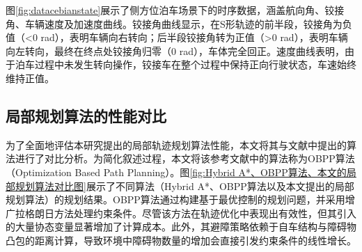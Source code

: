 \documentclass[master,academic]{ysuthesis} %
\begin{document}
		图\ref{fig:datacebianstate}展示了侧方位泊车场景下的时序数据，涵盖航向角、铰接角、车辆速度及加速度曲线。铰接角曲线显示，在S形轨迹的前半段，铰接角为负值（<0 rad），表明车辆向右转向；后半段铰接角转为正值（>0 rad），表明车辆向左转向，最终在终点处铰接角归零（0 rad），车体完全回正。速度曲线表明，由于泊车过程中未发生转向操作，铰接车在整个过程中保持正向行驶状态，车速始终维持正值。

		\subsection{局部规划算法的性能对比}
		为了全面地评估本研究提出的局部轨迹规划算法性能，本文将其与文献\cite{9216948}中提出的算法进行了对比分析。为简化叙述过程，本文将该参考文献中的算法称为OBPP算法（Optimization Based Path Planning）。图\ref{fig:Hybrid A*、OBPP算法、本文的局部规划算法对比图}展示了不同算法（Hybrid A*、OBPP算法以及本文提出的局部规划算法）的规划结果。OBPP算法通过构建基于最优控制的规划问题，并采用增广拉格朗日方法处理约束条件。尽管该方法在轨迹优化中表现出有效性，但其引入的大量协态变量显著增加了计算成本。此外，其避障策略依赖于自车结构与障碍物凸包的距离计算，导致环境中障碍物数量的增加会直接引发约束条件的线性增长。
\end{document}
